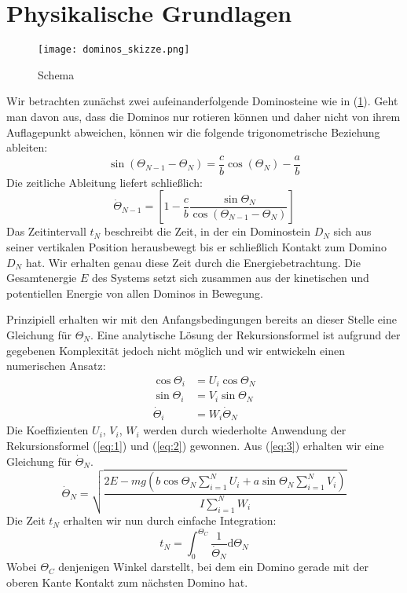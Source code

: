 \documentclass[11pt,a4paper]{scrartcl}
\begin{document}
\section{Physikalische Grundlagen}
\begin{figure}[h!]
	\centering
	\texttt{[image: dominos\_skizze.png]}
	\caption{Schema}
    \label{abb:1}
\end{figure}
Wir betrachten zunächst zwei aufeinanderfolgende Dominosteine wie in (\ref{abb:1}). Geht man davon aus, dass die Dominos nur rotieren können und daher nicht von ihrem Auflagepunkt abweichen, können wir die folgende trigonometrische Beziehung ableiten:
\begin{equation}
    \sin(\Theta_{N-1} - \Theta_{N}) = \frac{c}{b} \cos(\Theta_{N}) - \frac{a}{b}
    \label{eq:1}
\end{equation}
Die zeitliche Ableitung liefert schließlich:
\begin{equation}
    \dot{\Theta}_{N-1} = \left[
        1-\frac{c}{b}
        \frac{\sin{\Theta_{N}}}
        {\cos{\left(\Theta_{N-1}-\Theta_{N}\right)}}
    \right]
    \label{eq:2}
\end{equation}
Das Zeitintervall $t_N$ beschreibt die Zeit, in der ein Dominostein $D_N$ sich
aus seiner vertikalen Position herausbewegt bis er schließlich Kontakt zum
Domino $D_N$ hat. Wir erhalten genau diese Zeit durch die Energiebetrachtung.
Die Gesamtenergie $E$ des Systems setzt sich zusammen aus der kinetischen und
potentiellen Energie von allen Dominos in Bewegung.

Prinzipiell erhalten wir mit den Anfangsbedingungen bereits an dieser Stelle
eine Gleichung für $\Theta_N$. Eine analytische Lösung der Rekursionsformel ist
aufgrund der gegebenen Komplexität jedoch nicht möglich und wir entwickeln
einen numerischen Ansatz:
\begin{align}
    \cos{\Theta_i} &= U_i\cos{\Theta_N} \nonumber \\
    \sin{\Theta_i} &= V_i\sin{\Theta_N} \label{eq:3} \\
    \dot{\Theta}_i &= W_i\dot{\Theta}_N \nonumber
\end{align}
Die Koeffizienten $U_i$, $V_i$, $W_i$ werden durch wiederholte Anwendung der
Rekursionsformel (\ref{eq:1}) und (\ref{eq:2}) gewonnen. Aus (\ref{eq:3})
erhalten wir eine Gleichung für $\dot{\Theta}_N$.
\begin{equation}
    \dot{\Theta}_N = \sqrt{\frac{2E - mg
        \left( b\cos{\Theta_N} \sum_{i=1}^N U_i
        + a\sin{\Theta_N} \sum_{i=1}^N V_i \right)}
    {I \sum_{i=1}^N W_i}}
    \label{eq:$}
\end{equation}
Die Zeit $t_N$ erhalten wir nun durch einfache Integration:
\begin{equation}
    t_N = \int_0^{\Theta_C} \frac{1}{\dot{\Theta}_N} \mathrm{d}\Theta_N
    \label{eq:5}
\end{equation}
Wobei $\Theta_C$ denjenigen Winkel darstellt, bei dem ein Domino gerade mit der
oberen Kante Kontakt zum nächsten Domino hat.
\end{document}
